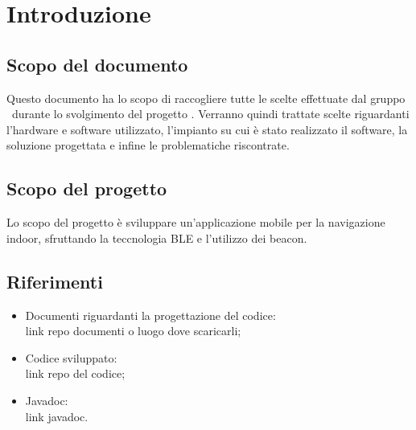 \documentclass[../DocumentazioneDelloStudio.tex]{subfiles}
\begin{document}
\section{Introduzione}
	\subsection{Scopo del documento}
	Questo documento ha lo scopo di raccogliere tutte le scelte effettuate dal gruppo \leaf\ durante lo svolgimento del progetto \progetto. Verranno quindi trattate scelte riguardanti l'hardware e software utilizzato, l'impianto su cui è stato realizzato il software, la soluzione progettata e infine le problematiche riscontrate.

	\subsection{Scopo del progetto}
	Lo scopo del progetto è sviluppare un'applicazione mobile per la navigazione indoor, sfruttando la teccnologia BLE e l'utilizzo dei beacon.

	\subsection{Riferimenti}
		\begin{itemize}
			\item Documenti riguardanti la progettazione del codice:\\
					link repo documenti o luogo dove scaricarli;
			\item Codice sviluppato:\\
					link repo del codice;
			\item Javadoc:\\
					link javadoc.
		\end{itemize}
\end{document}
